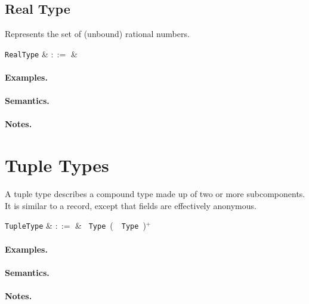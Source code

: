 \subsection{Real Type}

Represents the set of (unbound) rational numbers.

\begin{syntax}
  \verb+RealType+ & $::=$ &  \\
\end{syntax}

\paragraph{Examples.}

\paragraph{Semantics.}

\paragraph{Notes.} 


\section{Tuple Types}

A tuple type describes a compound type made up of two or more subcomponents. It is similar to a record, except that fields are effectively anonymous.

\begin{syntax}
  \verb+TupleType+ & $::=$ & \token{(}\ \verb+Type+\ \big(\ \token{,}\
  \verb+Type+\ \big)$^+$\ \token{)}\\
\end{syntax}

\paragraph{Examples.}

\paragraph{Semantics.}

\paragraph{Notes.}

